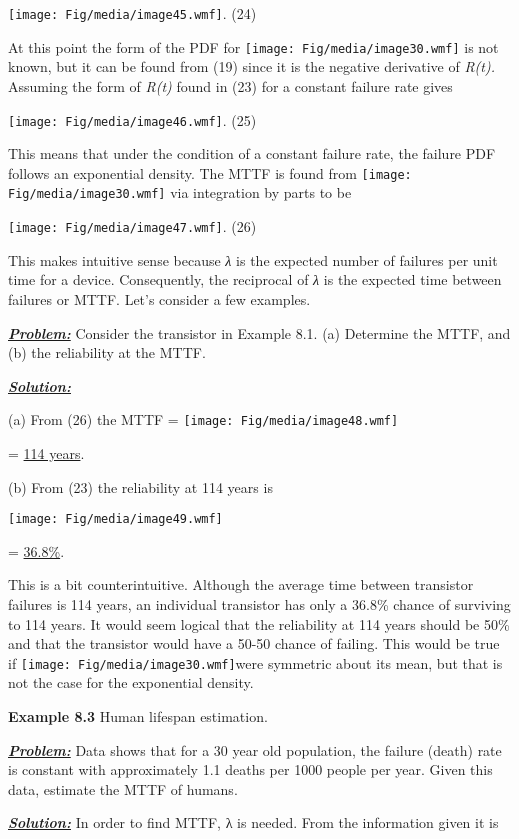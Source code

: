 \texttt{[image: Fig/media/image45.wmf]}. (24)

At this point the form of the PDF for
\texttt{[image: Fig/media/image30.wmf]} is not known, but it can be
found from (19) since it is the negative derivative of \emph{R(t).}
Assuming the form of \emph{R(t)} found in (23) for a constant failure
rate gives

\texttt{[image: Fig/media/image46.wmf]}. (25)

This means that under the condition of a constant failure rate, the
failure PDF follows an exponential density. The MTTF is found from
\texttt{[image: Fig/media/image30.wmf]} via integration by parts to be

\texttt{[image: Fig/media/image47.wmf]}. (26)

This makes intuitive sense because \emph{λ} is the expected number of
failures per unit time for a device. Consequently, the reciprocal of
\emph{λ} is the expected time between failures or MTTF. Let's consider a
few examples.

\emph{\textbf{\ul{Problem:}}} Consider the transistor in Example 8.1.
(a) Determine the MTTF, and (b) the reliability at the MTTF.

\emph{\textbf{\ul{Solution:}}}

(a) From (26) the MTTF = \texttt{[image: Fig/media/image48.wmf]}

= \ul{114 years}.

(b) From (23) the reliability at 114 years is

\texttt{[image: Fig/media/image49.wmf]}

= \ul{36.8\%}.

This is a bit counterintuitive. Although the average time between
transistor failures is 114 years, an individual transistor has only a
36.8\% chance of surviving to 114 years. It would seem logical that the
reliability at 114 years should be 50\% and that the transistor would
have a 50-50 chance of failing. This would be true if
\texttt{[image: Fig/media/image30.wmf]}were symmetric about its mean,
but that is not the case for the exponential density.

\textbf{Example 8.3} Human lifespan estimation.

\emph{\textbf{\ul{Problem:}}} Data shows that for a 30 year old
population, the failure (death) rate is constant with approximately 1.1
deaths per 1000 people per year. Given this data, estimate the MTTF of
humans.

\emph{\textbf{\ul{Solution:}}} In order to find MTTF, λ is needed. From
the information given it is

